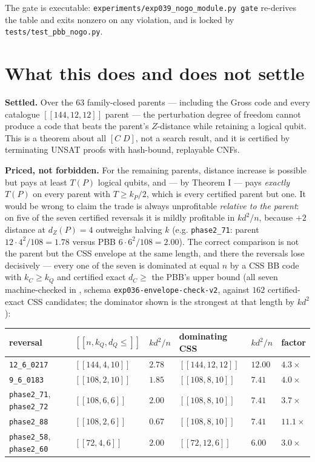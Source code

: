 \documentclass[11pt]{article}
\newcommand{\nk}[1]{[\![#1]\!]}
\theoremstyle{plain}
\theoremstyle{remark}
\begin{document}
The gate is executable: \texttt{experiments/exp039\_nogo\_module.py gate} re-derives the table and
exits nonzero on any violation, and is locked by \texttt{tests/test\_pbb\_nogo.py}.

\section{What this does and does not settle}\label{sec:settle}

\textbf{Settled.} Over the $63$ family-closed parents --- including the Gross code and every
catalogue $\nk{144,12,12}$ parent --- the perturbation degree of freedom cannot produce a
code that beats the parent's $Z$-distance while retaining a logical qubit. This is a
theorem about all $[C\;D]$, not a search result, and it is certified by terminating UNSAT
proofs with hash-bound, replayable CNFs.

\textbf{Priced, not forbidden.} For the remaining parents, distance increase is possible but
pays at least $T(P)$ logical qubits, and --- by Theorem I --- pays \emph{exactly} $T(P)$ on
every parent with $T\ge k_P/2$, which is every certified parent but one. It would be
wrong to claim the trade is always unprofitable \emph{relative to the parent}: on five of the
seven certified reversals it is mildly profitable in $kd^2/n$, because $+2$ distance at
$d_Z(P)=4$ outweighs halving $k$ (e.g. \texttt{phase2\_71}: parent $12\cdot 4^2/108=1.78$ versus
PBB $6\cdot 6^2/108=2.00$). The correct comparison is not the parent but the CSS envelope
at the same length, and there the reversals lose decisively --- every one of the seven is
dominated at equal $n$ by a CSS BB code with $k_C\ge k_Q$ and certified exact
$d_C\ge$ the PBB's upper bound (all seven machine-checked in
, schema
\texttt{exp036-envelope-check-v2}, against $162$ certified-exact CSS candidates; the dominator
shown is the strongest at that length by $kd^2$):

\begin{table}[ht]
\centering
\small
\begin{tabular}{llllll}
\toprule
reversal & $\nk{n,k_Q,d_Q{\le}}$ & $kd^2/n$ & dominating CSS & $kd^2/n$ & factor \\
\midrule
\texttt{12\_6\_0217} & $\nk{144,4,10}$ & $2.78$ & $\nk{144,12,12}$ & $12.00$ & $4.3\times$ \\
\texttt{9\_6\_0183} & $\nk{108,2,10}$ & $1.85$ & $\nk{108,8,10}$ & $7.41$ & $4.0\times$ \\
\texttt{phase2\_71}, \texttt{phase2\_72} & $\nk{108,6,6}$ & $2.00$ & $\nk{108,8,10}$ & $7.41$ & $3.7\times$ \\
\texttt{phase2\_88} & $\nk{108,2,6}$ & $0.67$ & $\nk{108,8,10}$ & $7.41$ & $11.1\times$ \\
\texttt{phase2\_58}, \texttt{phase2\_60} & $\nk{72,4,6}$ & $2.00$ & $\nk{72,12,6}$ & $6.00$ & $3.0\times$ \\
\bottomrule
\end{tabular}
\end{table}
\end{document}
